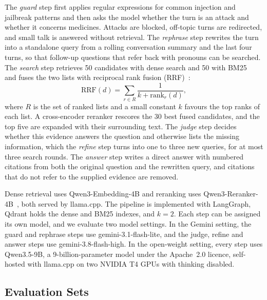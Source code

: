 The \emph{guard} step first applies regular expressions for common injection and jailbreak patterns and then asks the model whether the turn is an attack and whether it concerns medicines. Attacks are blocked, off-topic turns are redirected, and small talk is answered without retrieval. The \emph{rephrase} step rewrites the turn into a standalone query from a rolling conversation summary and the last four turns, so that follow-up questions that refer back with pronouns can be searched. The \emph{search} step retrieves 50 candidates with dense search and 50 with BM25~\cite{robertson2009bm25} and fuses the two lists with reciprocal rank fusion (RRF)~\cite{cormack2009rrf}:
\begin{equation}\label{eq:rrf}
\mathrm{RRF}(d)=\sum_{r\in R}\frac{1}{k+\mathrm{rank}_r(d)},
\end{equation}
\noindent where $R$ is the set of ranked lists and a small constant $k$ favours the top ranks of each list. A cross-encoder reranker rescores the 30 best fused candidates, and the top five are expanded with their surrounding text. The \emph{judge} step decides whether this evidence answers the question and otherwise lists the missing information, which the \emph{refine} step turns into one to three new queries, for at most three search rounds. The \emph{answer} step writes a direct answer with numbered citations from both the original question and the rewritten query, and citations that do not refer to the supplied evidence are removed.

Dense retrieval uses Qwen3-Embedding-4B and reranking uses Qwen3-Reranker-4B~\cite{zhang2025qwen3emb}, both served by llama.cpp. The pipeline is implemented with LangGraph, Qdrant holds the dense and BM25 indexes, and $k=2$. Each step can be assigned its own model, and we evaluate two model settings. In the Gemini setting, the guard and rephrase steps use gemini-3.1-flash-lite, and the judge, refine and answer steps use gemini-3.8-flash-high. In the open-weight setting, every step uses Qwen3.5-9B, a 9-billion-parameter model under the Apache~2.0 licence, self-hosted with llama.cpp on two NVIDIA T4 GPUs with thinking disabled.

\subsection{Evaluation Sets}\label{sec:eval-sets}

